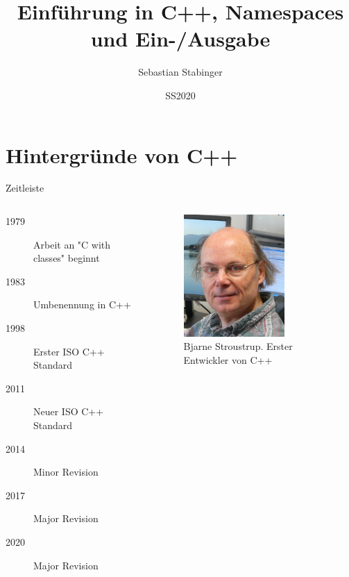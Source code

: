 \documentclass[presentation]{beamer}
\author{Sebastian Stabinger}
\date{SS2020}
\title{Einführung in C++, Namespaces und Ein-/Ausgabe}
\begin{document}
\maketitle

\section{Hintergründe von C++}
\label{sec:orga98b9bb}
\begin{frame}[label={sec:org4cffd0f}]{Zeitleiste}
\begin{columns}
\begin{column}{0.5\columnwidth}
\begin{description}
\item[{1979}] Arbeit an "C with classes" beginnt
\item[{1983}] Umbenennung in C++
\item[{1998}] Erster ISO C++ Standard
\item[{2011}] \alert{Neuer ISO C++ Standard}
\item[{2014}] Minor Revision
\item[{2017}] Major Revision
\item[{2020}] Major Revision
\end{description}
\end{column}
\begin{column}{0.5\columnwidth}
\begin{center}\begin{figure}[htbp]
\centering
\includegraphics[width=0.7\textwidth]{data/ae/50aadc-3e16-4ac9-9f73-cf048cdfa434/screenshot-20160217-143616.png}
\caption{Bjarne Stroustrup. Erster Entwickler von C++}
\end{figure}\end{center}
\end{column}
\end{columns}
\end{frame}
\end{document}
